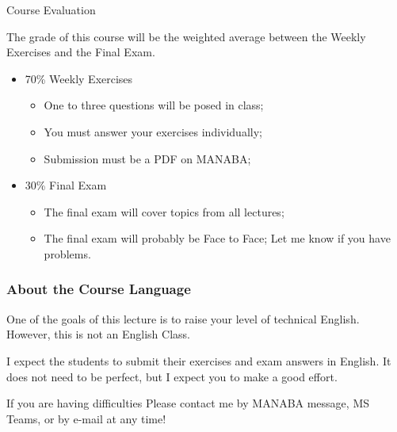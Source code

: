\documentclass[aspectratio=169]{beamer}
\begin{document}
\begin{frame}{Course Evaluation}{}

  The grade of this course will be the weighted average between the Weekly Exercises and the Final Exam.\bigskip

  \begin{itemize}
  \item 70\% Weekly Exercises
    \begin{itemize}
    \item One to three questions will be posed in class;
    \item You must answer your exercises individually;
    \item Submission must be a PDF on MANABA;
    \end{itemize}
    \bigskip

  \item 30\% Final Exam
  \begin{itemize}
    \item The final exam will cover topics from all lectures;
    \item The final exam will probably be \alert{Face to Face}; Let me know if you have problems.
  \end{itemize}
  \end{itemize}
\end{frame}

\begin{frame}
  \frametitle{About the Course Language}

  One of the goals of this lecture is to raise your level of technical
  English. However, this is not an English Class.

  \bigskip

  I expect the students to submit their exercises and exam answers in
  English. It does not need to be perfect, but I expect you to make a
  good effort.

  \bigskip

  \begin{block}{If you are having difficulties}
    Please contact me by MANABA message, MS Teams, or by e-mail at any time!
  \end{block}

\end{frame}
\end{document}
